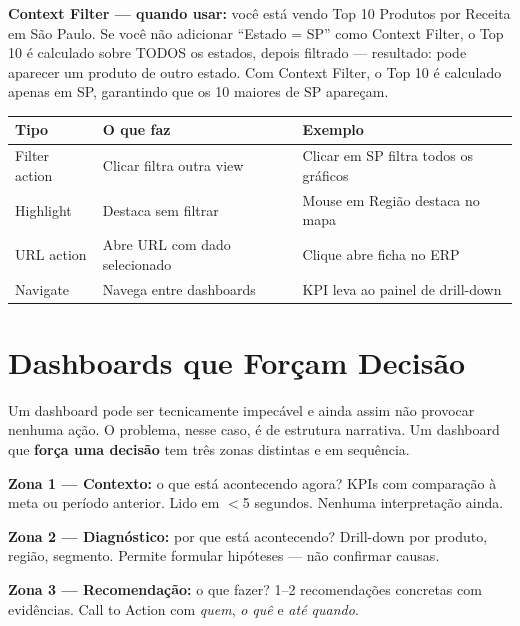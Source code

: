 \textbf{Context Filter --- quando usar:} você está vendo Top 10 Produtos por Receita em São Paulo. Se você não adicionar ``Estado = SP'' como Context Filter, o Top 10 é calculado sobre TODOS os estados, depois filtrado --- resultado: pode aparecer um produto de outro estado. Com Context Filter, o Top 10 é calculado apenas em SP, garantindo que os 10 maiores de SP apareçam.

\begin{BoardBox}[title=Ações de Dashboard --- 4 Tipos]
\begin{tabular}{@{}lp{4cm}p{4.8cm}@{}}
\toprule
\textbf{Tipo}     & \textbf{O que faz}                  & \textbf{Exemplo} \\
\midrule
Filter action   & Clicar filtra outra view             & Clicar em SP filtra todos os gráficos \\
Highlight       & Destaca sem filtrar                  & Mouse em Região destaca no mapa \\
URL action      & Abre URL com dado selecionado        & Clique abre ficha no ERP \\
Navigate        & Navega entre dashboards              & KPI leva ao painel de drill-down \\
\bottomrule
\end{tabular}
\end{BoardBox}

\section{Dashboards que Forçam Decisão}

Um dashboard pode ser tecnicamente impecável e ainda assim não provocar nenhuma ação. O problema, nesse caso, é de estrutura narrativa. Um dashboard que \textbf{força uma decisão} tem três zonas distintas e em sequência.

\begin{BoardBox}[title=As 3 Zonas do Dashboard Decisório]
\textbf{Zona 1 --- Contexto:} o que está acontecendo agora? KPIs com comparação à meta ou período anterior. Lido em $<$5 segundos. Nenhuma interpretação ainda.

\textbf{Zona 2 --- Diagnóstico:} por que está acontecendo? Drill-down por produto, região, segmento. Permite formular hipóteses --- não confirmar causas.

\textbf{Zona 3 --- Recomendação:} o que fazer? 1--2 recomendações concretas com evidências. Call to Action com \emph{quem}, \emph{o quê} e \emph{até quando}.
\end{BoardBox}

